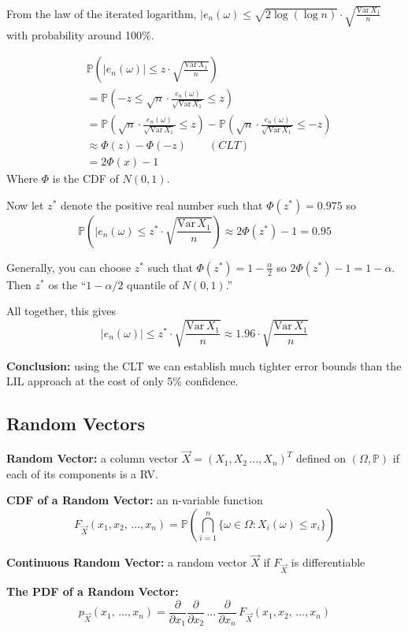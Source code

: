 \documentclass[12pt]{article}
\renewcommand{\P}{\mathbb{P}}
\newcommand{\Var}{\text{Var}\,}
\begin{document}
From the law of the iterated logarithm, $|e_n(\omega) \leq \sqrt{2\log(\log n)} \cdot \sqrt{\frac{\Var X_1}{n}}$ with probability around 100\%. 

\begin{align*}
    &\P\left(|e_n(\omega)| \leq z \cdot \sqrt{\frac{\Var X_1}{n}}\right)\\
    &= \P(-z \leq \sqrt{n} \cdot \frac{e_n(\omega)}{\sqrt{\Var X_1}} \leq z)\\
    &= \P\left(\sqrt{n} \cdot \frac{e_n(\omega)}{\sqrt{\Var X_1}} \leq z\right) - \P\left(\sqrt{n} \cdot \frac{e_n(\omega)}{\sqrt{\Var X_1}} \leq -z\right)\\
    &\approx \Phi(z) - \Phi(-z) \qquad (CLT)\\
    &= 2\Phi(x) - 1
\end{align*}
Where $\Phi$ is the CDF of $N(0, 1)$.

Now let $z^*$ denote the positive real number such that $\Phi(z^*) = 0.975$ so 
\[\P\left(|e_n(\omega) \leq z^* \cdot \sqrt{\frac{\Var X_1}{n}}\right) \approx 2\Phi(z^*) - 1 = 0.95\] 

Generally, you can choose $z^*$ such that $\Phi(z^*) = 1- \frac{\alpha}{2}$ so $2\Phi(z^*) -1 = 1- \alpha$. Then $z^*$ os the ``$1 - \alpha/2$ quantile of $N(0, 1)$.'' 

All together, this gives
\[|e_n(\omega)| \leq z^* \cdot \sqrt{\frac{\Var X_1}{n}} \approx 1.96 \cdot \sqrt{\frac{\Var X_1}{n}}\]

\textbf{Conclusion:} using the CLT we can establish much tighter error bounds than the LIL approach at the cost of only 5\% confidence. 

\subsection{Random Vectors}
\textbf{Random Vector:} a column vector $\vec{X} = (X_1, X_2\, ..., X_n)^T$ defined on $(\Omega, \P)$ if each of its components is a RV. 

\textbf{CDF of a Random Vector:} an n-variable function 
\[F_{\vec{X}}(x_1, x_2, \, ..., x_n) = \P\left(\bigcap_{i=1}^n \{\omega \in \Omega: X_i(\omega) \leq x_i\}\right)\]

\textbf{Continuous Random Vector:} a random vector $\vec{X}$ if $F_{\vec{X}}$ is differentiable 

\textbf{The PDF of a Random Vector:}
\[p_{\vec{X}}(x_1, \, ..., x_n) = \frac{\partial}{\partial x_1}\frac{\partial}{\partial x_2}\,...\,\frac{\partial}{\partial x_n} \, F_{\vec{X}}(x_1, x_2,\, ..., x_n)\]
\end{document}
